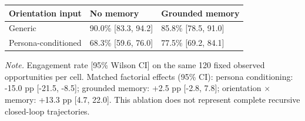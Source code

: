 \begin{tabular}{lll}
\toprule
\textbf{Orientation input} & \textbf{No memory} & \textbf{Grounded memory} \\
\midrule
Generic & 90.0\% [83.3, 94.2] & 85.8\% [78.5, 91.0] \\
Persona-conditioned & 68.3\% [59.6, 76.0] & 77.5\% [69.2, 84.1] \\
\bottomrule
\end{tabular}

\par\footnotesize\textit{Note.} Engagement rate [95\% Wilson CI] on the same 120 fixed observed opportunities per cell. Matched factorial effects (95\% CI): persona conditioning: -15.0 pp [-21.5, -8.5]; grounded memory: +2.5 pp [-2.8, 7.8]; orientation \ensuremath{\times} memory: +13.3 pp [4.7, 22.0]. This ablation does not represent complete recursive closed-loop trajectories.
